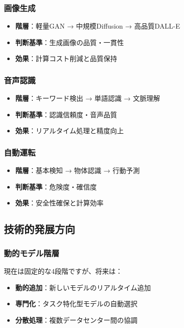 \documentclass[a4paper,12pt]{jsarticle}
\begin{document}
\subsubsection{画像生成}

\begin{itemize}
\item \textbf{階層}：軽量GAN → 中規模Diffusion → 高品質DALL-E
\item \textbf{判断基準}：生成画像の品質・一貫性
\item \textbf{効果}：計算コスト削減と品質保持
\end{itemize}

\subsubsection{音声認識}

\begin{itemize}
\item \textbf{階層}：キーワード検出 → 単語認識 → 文脈理解
\item \textbf{判断基準}：認識信頼度・音声品質
\item \textbf{効果}：リアルタイム処理と精度向上
\end{itemize}

\subsubsection{自動運転}

\begin{itemize}
\item \textbf{階層}：基本検知 → 物体認識 → 行動予測
\item \textbf{判断基準}：危険度・確信度
\item \textbf{効果}：安全性確保と計算効率
\end{itemize}

\subsection{技術的発展方向}

\subsubsection{動的モデル階層}

現在は固定的な4段階ですが、将来は：

\begin{itemize}
\item \textbf{動的追加}：新しいモデルのリアルタイム追加
\item \textbf{専門化}：タスク特化型モデルの自動選択
\item \textbf{分散処理}：複数データセンター間の協調
\end{itemize}
\end{document}

